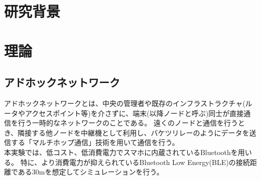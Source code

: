\documentclass[a4paper, 10pt]{ltjsarticle}
\begin{document}
\setlength{\columnsep}{7.5mm}

\twocolumn[
    \begin{center}
        {\vspace{-1em}}

        {\fontsize{15pt}{15pt}\selectfont{アドホックネットワークについての研究(仮)}}

        {\vspace{1.5em}}

        {\fontsize{13pt}{13pt}\selectfont{}}
    \end{center}



    \begin{flushright}
      {\fontsize{11pt}{11pt}\selectfont{T5-17　末廣隼人\\}}
      {\fontsize{11pt}{11pt}\selectfont{指導教員　髙﨑和之}}
    \end{flushright}

    \vspace{1em}

    \thispagestyle{empty}
]

\section{研究背景}


\section{理論}
\subsection{アドホックネットワーク}
アドホックネットワークとは、中央の管理者や既存のインフラストラクチャ(ルータやアクセスポイント等)を介さずに、端末(以降ノードと呼ぶ)同士が直接通信を行う一時的なネットワークのことである。
遠くのノードと通信を行うとき、隣接する他ノードを中継機として利用し、バケツリレーのようにデータを送信する「マルチホップ通信」技術を用いて通信を行う。%
\\ \indent 本実験では、低コスト、低消費電力でスマホに内蔵されているBluetoothを用いる。
特に、より消費電力が抑えられているBluetooth Low Energy(BLE)の接続距離である30mを想定してシミュレーションを行う。
\end{document}

